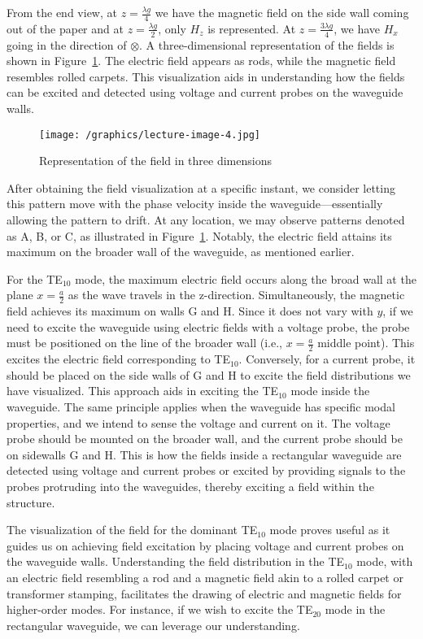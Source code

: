 From the end view, at $z=\frac{\lambda g}{4}$ we have the magnetic field on the side wall coming out of the paper and at $z=\frac{\lambda g}{2}$, only $H_{z}$ is represented. At $z=\frac{3\lambda g}{4}$, we have $H_{x}$ going in the direction of $\otimes$. A three-dimensional representation of the fields is shown in Figure~\ref{fig:lectureimage4}. The electric field appears as rods, while the magnetic field resembles rolled carpets. This visualization aids in understanding how the fields can be excited and detected using voltage and current probes on the waveguide walls.
\begin{figure}[h]
\centering
\texttt{[image: /graphics/lecture-image-4.jpg]}
\caption{Representation of the field in three dimensions}
\label{fig:lectureimage4}
\end{figure}

After obtaining the field visualization at a specific instant, we consider letting this pattern move with the phase velocity inside the waveguide—essentially allowing the pattern to drift. At any location, we may observe patterns denoted as A, B, or C, as illustrated in Figure~\ref{fig:lectureimage4}. Notably, the electric field attains its maximum on the broader wall of the waveguide, as mentioned earlier.

For the TE$_{10}$ mode, the maximum electric field occurs along the broad wall at the plane $x = \frac{a}{2}$ as the wave travels in the z-direction. Simultaneously, the magnetic field achieves its maximum on walls G and H. Since it does not vary with $y$, if we need to excite the waveguide using electric fields with a voltage probe, the probe must be positioned on the line of the broader wall (i.e., $x = \frac{a}{2}$ middle point). This excites the electric field corresponding to TE$_{10}$. Conversely, for a current probe, it should be placed on the side walls of G and H to excite the field distributions we have visualized. This approach aids in exciting the TE$_{10}$ mode inside the waveguide. The same principle applies when the waveguide has specific modal properties, and we intend to sense the voltage and current on it. The voltage probe should be mounted on the broader wall, and the current probe should be on sidewalls G and H. This is how the fields inside a rectangular waveguide are detected using voltage and current probes or excited by providing signals to the probes protruding into the waveguides, thereby exciting a field within the structure.

The visualization of the field for the dominant TE$_{10}$ mode proves useful as it guides us on achieving field excitation by placing voltage and current probes on the waveguide walls. Understanding the field distribution in the TE$_{10}$ mode, with an electric field resembling a rod and a magnetic field akin to a rolled carpet or transformer stamping, facilitates the drawing of electric and magnetic fields for higher-order modes. For instance, if we wish to excite the TE$_{20}$ mode in the rectangular waveguide, we can leverage our understanding.

